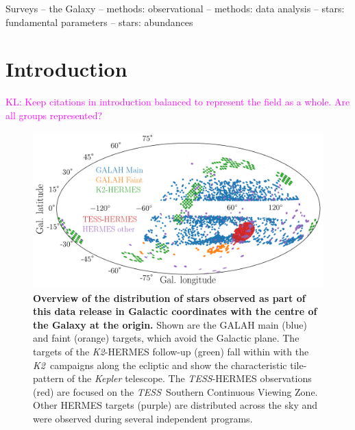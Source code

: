 \documentclass[fleqn,usenatbib,useAMS]{mnras}
\newcommand{\tess}{\textit{TESS}\xspace}
\newcommand{\Ktwo}{\textit{K2}\xspace}
\newcommand\KL[1]{\textcolor{magenta}{KL: #1}}
\begin{document}
\begin{keywords}
Surveys -- 
the Galaxy --
methods: observational --
methods: data analysis --
stars: fundamental parameters -- 
stars: abundances
\end{keywords}



\newpage
\section{Introduction} \label{sec:introduction}

\KL{Keep citations in introduction balanced to represent the field as a whole. Are all groups represented?}
\begin{figure}
\centering
\includegraphics[width=\textwidth]{figures/lb_overview_colored.png}
\caption{\textbf{Overview of the distribution of stars observed as part of this data release in Galactic coordinates with the centre of the Galaxy at the origin.} Shown are the GALAH main (blue) and faint (orange) targets, which avoid the Galactic plane. The targets of the \Ktwo-HERMES follow-up (green) fall within with the \Ktwo\ campaigns along the ecliptic and show the characteristic tile-pattern of the \textit{Kepler} telescope. The \tess-HERMES observations (red) are focused on the \tess\ Southern Continuous Viewing Zone. Other HERMES targets (purple) are distributed across the sky and were observed during several independent programs.}
\label{fig:lb_overview_colored}
\end{figure}
\end{document}
